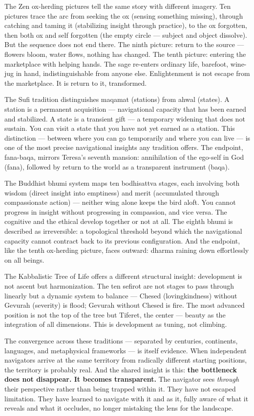 The Zen ox-herding pictures tell the same story with different imagery. Ten pictures trace the arc from seeking the ox (sensing something missing), through catching and taming it (stabilizing insight through practice), to the ox forgotten, then both ox and self forgotten (the empty circle — subject and object dissolve). But the sequence does not end there. The ninth picture: return to the source — flowers bloom, water flows, nothing has changed. The tenth picture: entering the marketplace with helping hands. The sage re-enters ordinary life, barefoot, wine-jug in hand, indistinguishable from anyone else. Enlightenment is not escape from the marketplace. It is return to it, transformed.


The Sufi tradition distinguishes maqamat (stations) from ahwal (states). A station is a permanent acquisition — navigational capacity that has been earned and stabilized. A state is a transient gift — a temporary widening that does not sustain. You can visit a state that you have not yet earned as a station. This distinction — between where you can go temporarily and where you can live — is one of the most precise navigational insights any tradition offers. The endpoint, fana-baqa, mirrors Teresa's seventh mansion: annihilation of the ego-self in God (fana), followed by return to the world as a transparent instrument (baqa).


The Buddhist bhumi system maps ten bodhisattva stages, each involving both wisdom (direct insight into emptiness) and merit (accumulated through compassionate action) — neither wing alone keeps the bird aloft. You cannot progress in insight without progressing in compassion, and vice versa. The cognitive and the ethical develop together or not at all. The eighth bhumi is described as irreversible: a topological threshold beyond which the navigational capacity cannot contract back to its previous configuration. And the endpoint, like the tenth ox-herding picture, faces outward: dharma raining down effortlessly on all beings.


The Kabbalistic Tree of Life offers a different structural insight: development is not ascent but harmonization. The ten sefirot are not stages to pass through linearly but a dynamic system to balance — Chesed (lovingkindness) without Gevurah (severity) is flood; Gevurah without Chesed is fire. The most advanced position is not the top of the tree but Tiferet, the center — beauty as the integration of all dimensions. This is development as tuning, not climbing.


The convergence across these traditions — separated by centuries, continents, languages, and metaphysical frameworks — is itself evidence. When independent navigators arrive at the same territory from radically different starting positions, the territory is probably real. And the shared insight is this: \textbf{the bottleneck does not disappear. It becomes transparent.} The navigator sees \textit{through} their perspective rather than being trapped within it. They have not escaped limitation. They have learned to navigate with it and as it, fully aware of what it reveals and what it occludes, no longer mistaking the lens for the landscape.


